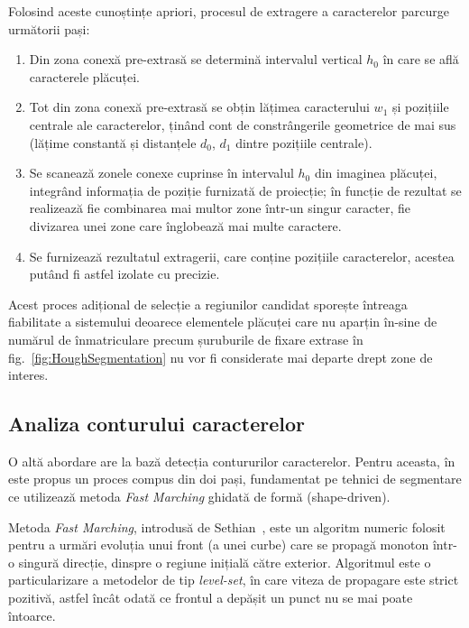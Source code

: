 Folosind aceste cunoștințe apriori, procesul de extragere a caracterelor parcurge următorii pași:
\begin{enumerate}
        \item Din zona conexă pre-extrasă se determină intervalul vertical $h_0$ în care se află caracterele plăcuței.
        \item Tot din zona conexă pre-extrasă se obțin lățimea caracterului $w_1$ și pozițiile centrale ale caracterelor, ținând cont de constrângerile geometrice de mai sus (lățime constantă și distanțele $d_0$, $d_1$ dintre pozițiile centrale).
        \item Se scanează zonele conexe cuprinse în intervalul $h_0$ din imaginea plăcuței, integrând informația de poziție furnizată de proiecție; în funcție de rezultat se realizează fie combinarea mai multor zone într-un singur caracter, fie divizarea unei zone care înglobează mai multe caractere.
        \item Se furnizează rezultatul extragerii, care conține pozițiile caracterelor, acestea putând fi astfel izolate cu precizie.
\end{enumerate}

Acest proces adițional de selecție a regiunilor candidat sporește întreaga fiabilitate a sistemului deoarece elementele plăcuței care nu aparțin în-sine de numărul de înmatriculare precum șuruburile de fixare extrase în fig.~\ref{fig:HoughSegmentation} nu vor fi considerate mai departe drept zone de interes.

\subsection{Analiza conturului caracterelor}
\indent\par
O altă abordare are la bază detecția contururilor caracterelor. Pentru aceasta, în~\cite{capar2006concurrent} este propus un proces compus din doi pași, fundamentat pe tehnici de segmentare ce utilizează metoda \textit{Fast Marching} ghidată de formă (shape-driven).

Metoda \textit{Fast Marching}, introdusă de Sethian~\cite{sethian1996fastmarching}, este un algoritm numeric folosit pentru a urmări evoluția unui front (a unei curbe) care se propagă monoton într-o singură direcție, dinspre o regiune inițială către exterior. Algoritmul este o particularizare a metodelor de tip \textit{level-set}, în care viteza de propagare este strict pozitivă, astfel încât odată ce frontul a depășit un punct nu se mai poate întoarce.

